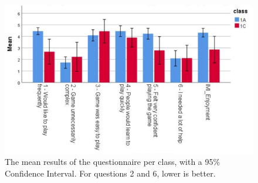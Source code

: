 \begin{figure}
	\centering
	\includegraphics[scale = 0.4]{MeanPerClass.png}
	\caption{The mean results of the questionnaire per class, with a 95\% Confidence Interval. For questions 2 and 6, lower is better.}
	\label{fig:Evaluation2}
\end{figure}



